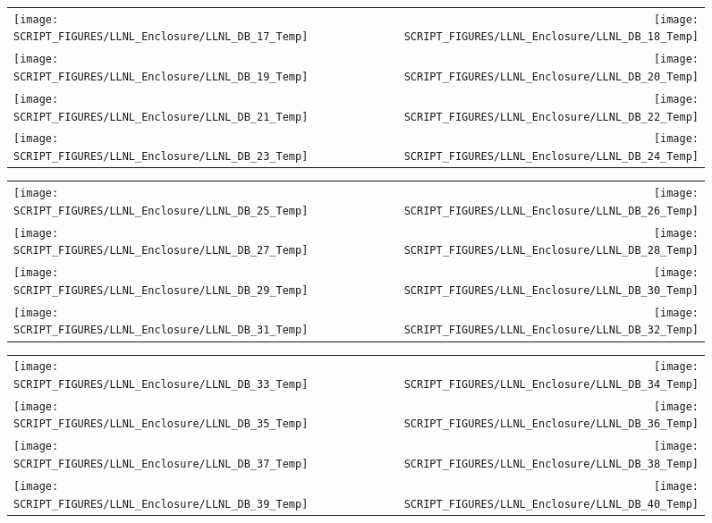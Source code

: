 \begin{figure}[p]
\begin{tabular*}{\textwidth}{l@{\extracolsep{\fill}}r}
\texttt{[image: SCRIPT\_FIGURES/LLNL\_Enclosure/LLNL\_DB\_17\_Temp]} &
\texttt{[image: SCRIPT\_FIGURES/LLNL\_Enclosure/LLNL\_DB\_18\_Temp]} \\
\texttt{[image: SCRIPT\_FIGURES/LLNL\_Enclosure/LLNL\_DB\_19\_Temp]} &
\texttt{[image: SCRIPT\_FIGURES/LLNL\_Enclosure/LLNL\_DB\_20\_Temp]} \\
\texttt{[image: SCRIPT\_FIGURES/LLNL\_Enclosure/LLNL\_DB\_21\_Temp]} &
\texttt{[image: SCRIPT\_FIGURES/LLNL\_Enclosure/LLNL\_DB\_22\_Temp]} \\
\texttt{[image: SCRIPT\_FIGURES/LLNL\_Enclosure/LLNL\_DB\_23\_Temp]} &
\texttt{[image: SCRIPT\_FIGURES/LLNL\_Enclosure/LLNL\_DB\_24\_Temp]}
\end{tabular*}
\end{figure}

\begin{figure}[p]
\begin{tabular*}{\textwidth}{l@{\extracolsep{\fill}}r}
\texttt{[image: SCRIPT\_FIGURES/LLNL\_Enclosure/LLNL\_DB\_25\_Temp]} &
\texttt{[image: SCRIPT\_FIGURES/LLNL\_Enclosure/LLNL\_DB\_26\_Temp]} \\
\texttt{[image: SCRIPT\_FIGURES/LLNL\_Enclosure/LLNL\_DB\_27\_Temp]} &
\texttt{[image: SCRIPT\_FIGURES/LLNL\_Enclosure/LLNL\_DB\_28\_Temp]} \\
\texttt{[image: SCRIPT\_FIGURES/LLNL\_Enclosure/LLNL\_DB\_29\_Temp]} &
\texttt{[image: SCRIPT\_FIGURES/LLNL\_Enclosure/LLNL\_DB\_30\_Temp]} \\
\texttt{[image: SCRIPT\_FIGURES/LLNL\_Enclosure/LLNL\_DB\_31\_Temp]} &
\texttt{[image: SCRIPT\_FIGURES/LLNL\_Enclosure/LLNL\_DB\_32\_Temp]}
\end{tabular*}
\end{figure}

\begin{figure}[p]
\begin{tabular*}{\textwidth}{l@{\extracolsep{\fill}}r}
\texttt{[image: SCRIPT\_FIGURES/LLNL\_Enclosure/LLNL\_DB\_33\_Temp]} &
\texttt{[image: SCRIPT\_FIGURES/LLNL\_Enclosure/LLNL\_DB\_34\_Temp]} \\
\texttt{[image: SCRIPT\_FIGURES/LLNL\_Enclosure/LLNL\_DB\_35\_Temp]} &
\texttt{[image: SCRIPT\_FIGURES/LLNL\_Enclosure/LLNL\_DB\_36\_Temp]} \\
\texttt{[image: SCRIPT\_FIGURES/LLNL\_Enclosure/LLNL\_DB\_37\_Temp]} &
\texttt{[image: SCRIPT\_FIGURES/LLNL\_Enclosure/LLNL\_DB\_38\_Temp]} \\
\texttt{[image: SCRIPT\_FIGURES/LLNL\_Enclosure/LLNL\_DB\_39\_Temp]} &
\texttt{[image: SCRIPT\_FIGURES/LLNL\_Enclosure/LLNL\_DB\_40\_Temp]}
\end{tabular*}
\end{figure}

